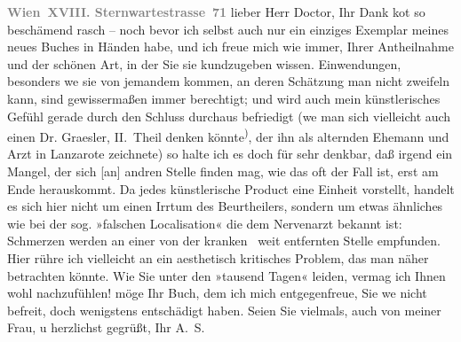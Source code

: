 \pstart
           \textcolor{gray}{\textbf{Wien XVIII. Sternwartestrasse 71}}\pend
           \vspace{0.5em}
\pstart
           lieber Herr Doctor, Ihr Dank ko{\geminationm}t so beschämend rasch – noch bevor
               ich selbst auch nur ein einziges Exemplar meines neues Buches in Händen habe, und ich freue mich wie immer, Ihrer
               Antheilnahme und der schönen Art, in der Sie sie kundzugeben wissen. Einwendungen,
               besonders we{\geminationn} sie von jemandem kommen, an deren Schätzung man nicht zweifeln kann,
               sind gewissermaßen immer berechtigt; und wird \introOben{}auch\introOben{} mein künstlerisches
               Gefühl gerade durch den Schluss durchaus befriedigt (we{\geminationn} man sich vielleicht auch
               einen Dr. Graesler, II. Theil denken könnte\substVorne{}\textsuperscript{)}\substDazwischen{},\substHinten{} der ihn als alternden Ehemann und Arzt in Lanzarote zeichnete) {\pb}so halte
               ich es \introOben{}doch\introOben{} für sehr denkbar, daß irgend ein Mangel, der sich
                  {[}an{]} andren Stelle finden mag, wie das oft der Fall ist, erst
               am Ende herauskommt. Da jedes künstlerische Product eine Einheit vorstellt, handelt
               es sich hier nicht um einen Irrtum des Beurtheilers, sondern um etwas ähnliches wie
               bei der sog. »falschen Localisation« die dem Nervenarzt bekannt ist: Schmerzen werden
               an einer von der kranken  weit entfernten
               Stelle empfunden. Hier rühre ich vielleicht an ein aesthetisch kritisches Problem,
               das man näher betrachten könnte. Wie Sie unter den »tausend Tagen« leiden, vermag ich
               Ihnen wohl nachzufühlen! möge Ihr Buch,
               dem ich mich entgegenfreue, Sie we{\geminationn} nicht befreit, doch wenigstens entschädigt
               haben.\pend
           \pstart Seien Sie vielmals, auch von meiner Frau, u herzlichst gegrüßt, Ihr \spacefill\mbox{A. S.}\pend{}\endnumbering{}
\begin{anhang}
\end{anhang}
      